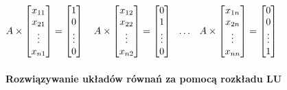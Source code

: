 \documentclass[11pt]{article}
\begin{document}
\begin{center}
\begin{math}
A \times
\begin{bmatrix}
    x_{11} \\
    x_{21} \\
    \vdots \\
    x_{n1} 
\end{bmatrix}
=
\begin{bmatrix}
    1 \\
    0 \\
    \vdots \\
    0
\end{bmatrix}
\hspace{1em}
A \times
\begin{bmatrix}
    x_{12} \\
    x_{22} \\
    \vdots \\
    x_{n2} 
\end{bmatrix}
=
\begin{bmatrix}
    0 \\
    1 \\
    \vdots \\
    0
\end{bmatrix}
\hspace{0.7em} \hdots \hspace{0.8em}
A \times
\begin{bmatrix}
    x_{1n} \\
    x_{2n} \\
    \vdots \\
    x_{nn} 
\end{bmatrix}
=
\begin{bmatrix}
    0 \\
    0 \\
    \vdots \\
    1
\end{bmatrix}
\end{math}
\end{center}

\paragraph{Rozwiązywanie układów równań za pomocą rozkładu LU}
\end{document}
